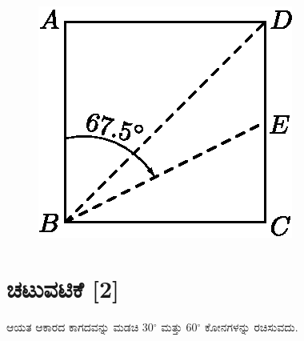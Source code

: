 \begin{figure}[H]
\centering
\includegraphics[scale=.98]{src/figure/chap1/fig1-7d.eps}
\end{figure}


\section*{ಚಟುವಟಿಕೆ [2]}  ಆಯತ ಆಕಾರದ ಕಾಗದವನ್ನು ಮಡಚಿ 30$^\circ$ ಮತ್ತು 60$^\circ$ ಕೋನಗಳನ್ನು ರಚಿಸುವದು. 

